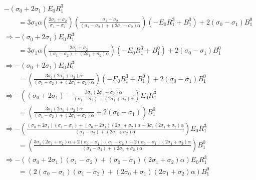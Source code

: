 \begin{displaymath}
    \begin{split}
    & - (\sigma_0 + 2\sigma_1)E_0 R_1^{3}
    \\ & \quad\quad
    =
    3\sigma_1\alpha \left(\frac{2\sigma_1 + \sigma_2}{\sigma_1 - \sigma_2}\right) \left(\frac{\sigma_1 - \sigma_2} {\left(\sigma_1 - \sigma_2\right) + \left(2\sigma_1 + \sigma_2\right)\alpha} \right)(-E_0 R_1^3 + B_1^0)
    + 2 (\sigma_0-\sigma_1)B_1^0
    \\
    & \Rightarrow
    - (\sigma_0 + 2\sigma_1)E_0 R_1^{3}
    \\ & \quad\quad
    =
    3\sigma_1\alpha\left(\frac{2\sigma_1 + \sigma_2} {(\sigma_1 - \sigma_2) + (2\sigma_1 + \sigma_2)\alpha} \right) (-E_0 R_1^3 + B_1^0)
    + 2 (\sigma_0-\sigma_1)B_1^0
    \\
    & \Rightarrow
    - (\sigma_0 + 2\sigma_1)E_0 R_1^{3}
    \\ & \quad\quad
     =
    \left(\frac{3\sigma_1(2\sigma_1 + \sigma_2)\alpha} {(\sigma_1 - \sigma_2) + (2\sigma_1 + \sigma_2)\alpha} \right)(-E_0 R_1^3 + B_1^0)
    + 2 (\sigma_0-\sigma_1)B_1^0
    \\
    & \Rightarrow
    -\left( (\sigma_0 + 2\sigma_1) - \frac{3\sigma_1(2\sigma_1 + \sigma_2)\alpha} {(\sigma_1 - \sigma_2) + (2\sigma_1 + \sigma_2)\alpha}\right)
    E_0 R_1^{3}
    \\ & \quad\quad
     =
    \left(\frac{3\sigma_1(2\sigma_1 + \sigma_2)\alpha} {(\sigma_1 - \sigma_2) + (2\sigma_1 + \sigma_2)\alpha} + 2 (\sigma_0-\sigma_1) \right)
    B_1^0
    \\
    & \Rightarrow
    -\left(
    \frac{(\sigma_0 + 2\sigma_1)(\sigma_1 - \sigma_2) + (\sigma_0 + 2\sigma_1)(2\sigma_1 + \sigma_2)\alpha- 3\sigma_1(2\sigma_1 + \sigma_2)\alpha}
    {(\sigma_1 - \sigma_2) + (2\sigma_1 + \sigma_2)\alpha}
    \right)
    E_0 R_1^{3}
    \\ & \quad\quad
     =
    \left(
    \frac{3\sigma_1(2\sigma_1 + \sigma_2)\alpha + 2 (\sigma_0-\sigma_1)(\sigma_1 - \sigma_2) + 2 (\sigma_0-\sigma_1)(2\sigma_1 + \sigma_2)\alpha}
    {(\sigma_1 - \sigma_2) + (2\sigma_1 + \sigma_2)\alpha}
    \right)
    B_1^0
    \\
    & \Rightarrow
    -\left(
    (\sigma_0 + 2\sigma_1)(\sigma_1 - \sigma_2) + (\sigma_0 - \sigma_1)(2\sigma_1 + \sigma_2)\alpha
    \right)
    E_0 R_1^{3}
    \\ & \quad\quad
    =
    \left(
    2 (\sigma_0-\sigma_1)(\sigma_1 - \sigma_2) + (2\sigma_0 + \sigma_1)(2\sigma_1 + \sigma_2)\alpha
    \right)
    B_1^0
    \end{split}
\end{displaymath}

